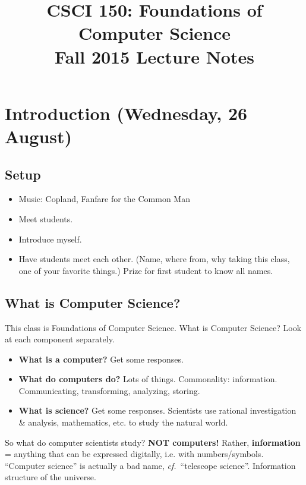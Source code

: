 \documentclass{article}
\begin{document}
\title{CSCI 150: Foundations of Computer Science \\ Fall 2015 Lecture Notes}

\maketitle

\section{Introduction (Wednesday, 26 August)}

\subsection*{Setup}

\begin{itemize}
\item Music: Copland, Fanfare for the Common Man
\item Meet students.
\item Introduce myself.
\item Have students meet each other. (Name, where from, why taking
  this class, one of your favorite things.)  Prize for first student
  to know all names.
\end{itemize}

\subsection*{What is Computer Science?}

This class is Foundations of Computer Science.  What is Computer
Science?  Look at each component separately.
\begin{itemize}
\item \textbf{What is a computer?}  Get some responses.
\item \textbf{What do computers do?}  Lots of things.  Commonality:
  information.  Communicating, transforming, analyzing, storing.
\item \textbf{What is science?}  Get some responses.  Scientists use
  rational investigation \& analysis, mathematics, etc. to study the
  natural world.
\end{itemize}

So what do computer scientists study?  \textbf{NOT computers!}
Rather, \textbf{information} = anything that can be expressed digitally,
i.e. with numbers/symbols.  ``Computer science'' is actually a bad
name, \emph{cf.}\ ``telescope science''.  Information structure of the
universe.
\end{document}
